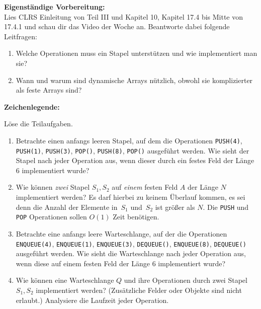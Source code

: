 \documentclass{uebung_cs}
\begin{document}
\textbf{Eigenständige Vorbereitung:}\\
Lies  CLRS Einleitung von Teil III und Kapitel 10, Kapitel 17.4 bis Mitte von 17.4.1 und schau dir das  Video der Woche an.
Beantworte dabei folgende Leitfragen:
\begin{enumerate}
	\item Welche Operationen muss ein Stapel unterstützen und wie implementiert man sie?
  \item Wann und warum sind dynamische Arrays nützlich, obwohl sie komplizierter als feste Arrays sind?
\end{enumerate}

\textbf{Zeichenlegende:}
\legende{}


\begin{aufgabe}
	Löse die Teilaufgaben.
	\begin{enumerate}
		\item \bestehen %
    Betrachte einen anfangs leeren Stapel, auf dem die Operationen \texttt{PUSH(4)}, \texttt{PUSH(1)}, \texttt{PUSH(3)}, \texttt{POP()}, \texttt{PUSH(8)}, \texttt{POP()} ausgeführt werden. Wie sieht der Stapel nach jeder Operation aus, wenn dieser durch ein festes Feld der Länge 6 implementiert wurde?
		\item \mittel Wie können \emph{zwei} Stapel $S_1, S_2$ auf \emph{einem} festen Feld $A$ der Länge $N$ implementiert werden?
		Es darf hierbei zu keinem Überlauf kommen, es sei denn die Anzahl der Elemente in~$S_1$ und~$S_2$ ist größer als $N$.
		Die \texttt{PUSH} und \texttt{POP} Operationen sollen $O(1)$ Zeit benötigen.
		\item \bestehen %
    Betrachte eine anfangs leere Warteschlange, auf der die Operationen \texttt{ENQUEUE(4)}, \texttt{ENQUEUE(1)}, \texttt{ENQUEUE(3)}, \texttt{DEQUEUE()}, \texttt{ENQUEUE(8)}, \texttt{DEQUEUE()} ausgeführt werden. Wie sieht die Warteschlange nach jeder Operation aus, wenn diese auf einem festen Feld der Länge 6 implementiert wurde?
		\item \note %
    Wie können eine Warteschlange $Q$ und ihre Operationen durch zwei Stapel $S_1, S_2$ implementiert werden? (Zusätzliche Felder oder Objekte sind nicht erlaubt.)
		Analysiere die Laufzeit jeder Operation.
	\end{enumerate}
\end{aufgabe}
\end{document}
